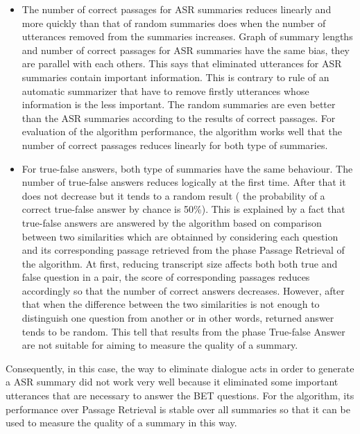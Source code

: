 \documentclass[10pt,a4paper]{article}
\numberwithin{algorithm}{section}  %
\begin{document}
\begin{itemize}
\item {The number of correct passages for ASR summaries reduces linearly and more quickly than that of random summaries does when the number of utterances removed from the summaries increases. Graph of summary lengths and number of correct passages for ASR summaries have the same bias, they are parallel with each others. This says that eliminated utterances for ASR summaries contain important information. This is contrary to rule of an automatic summarizer that have to remove firstly utterances whose information is the less important. The random summaries are even better than the ASR summaries according to the results of correct passages. For evaluation of the algorithm performance, the algorithm works well that the number of correct passages reduces linearly for both type of summaries. }
\item {For true-false answers, both type of summaries have the same behaviour. The number of true-false answers reduces logically at the first time. After that it does not decrease but it tends to a random result ( the probability of a correct true-false answer by chance is 50\%). This is explained by a fact that true-false answers are answered by the algorithm based on comparison between two similarities which are obtainned by considering each question and its corresponding passage retrieved from the phase Passage Retrieval of the algorithm. At first, reducing transcript size affects both both true and false question in a pair, the score of corresponding passages reduces accordingly so that the number of correct answers decreases. However, after that when the difference between the two similarities is not enough to distinguish one question from another or in other words, returned answer tends to be random. This tell that results from the phase True-false Answer are not suitable for aiming to measure the quality of a summary.}

\end{itemize}

Consequently, in this case, the way to eliminate dialogue acts in order to generate a ASR summary did not work very well because it eliminated some important utterances that are necessary to answer the BET questions. For the algorithm, its performance over Passage Retrieval is stable over all summaries so that it can be used to measure the quality of a summary in this way.
\newpage
\end{document}
